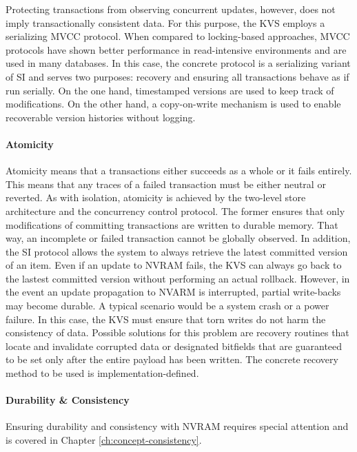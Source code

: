 Protecting transactions from observing concurrent updates, however, does not
imply transactionally consistent data. For this purpose, the KVS employs a
serializing MVCC protocol. When compared to locking-based approaches, MVCC
protocols have shown better performance in read-intensive environments and are
used in many databases. In this case, the concrete protocol is a serializing
variant of SI and serves two purposes: recovery and ensuring all transactions
behave as if run serially. On the one hand, timestamped versions are used to
keep track of modifications. On the other hand, a copy-on-write mechanism is
used to enable recoverable version histories without logging.

\paragraph{Atomicity}

Atomicity means that a transactions either succeeds as a whole or it fails
entirely. This means that any traces of a failed transaction must be either
neutral or reverted. As with isolation, atomicity is achieved by the two-level
store architecture and the concurrency control protocol. The former ensures that
only modifications of committing transactions are written to durable memory.
That way, an incomplete or failed transaction cannot be globally observed. In
addition, the SI protocol allows the system to always retrieve the latest
committed version of an item. Even if an update to NVRAM fails, the KVS can
always go back to the lastest committed version without performing an actual
rollback. However, in the event an update propagation to NVARM is interrupted,
partial write-backs may become durable. A typical scenario would be a system
crash or a power failure. In this case, the KVS must ensure that torn writes
do not harm the consistency of data. Possible solutions for this problem are
recovery routines that locate and invalidate corrupted data or designated
bitfields that are guaranteed to be set only after the entire payload has been
written. The concrete recovery method to be used is implementation-defined.

\paragraph{Durability \& Consistency}

Ensuring durability and consistency with NVRAM requires special attention and is
covered in Chapter \ref{ch:concept-consistency}.


